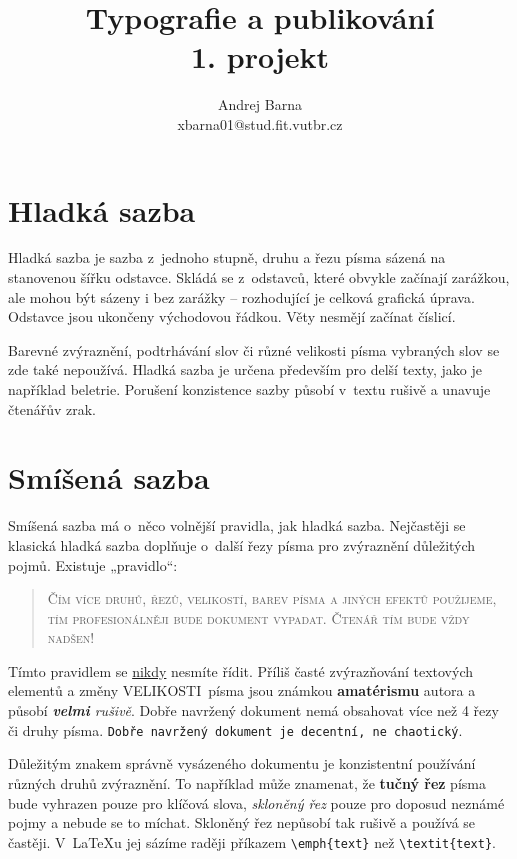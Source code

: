 \documentclass [11pt,a4paper,twocolumn]{article}
\title{Typografie a publikování\\ 
1. projekt}
\author{Andrej Barna\\
xbarna01@stud.fit.vutbr.cz}
\date{}
\providecommand{\uv}[1]{„#1“}
\begin{document}
\maketitle
\section{Hladká sazba}
Hladká sazba je sazba z~jednoho stupně, druhu a řezu písma sázená na stanovenou šířku odstavce. Skládá se z~odstavců, které obvykle začínají zarážkou, ale mohou být sázeny i bez zarážky -- rozhodující je celková grafická úprava. Odstavce jsou ukončeny východovou řádkou. Věty nesmějí začínat číslicí.

Barevné zvýraznění, podtrhávání slov či různé velikosti písma vybraných slov se zde také nepoužívá. Hladká sazba je určena především pro delší texty, jako je například beletrie. Porušení konzistence sazby působí v~textu rušivě a unavuje čtenářův zrak.

\section{Smíšená sazba}

Smíšená sazba má o~něco volnější pravidla, jak hladká sazba. Nejčastěji se klasická hladká sazba doplňuje o~další řezy písma pro zvýraznění důležitých pojmů. Existuje \uv{pravidlo}:

\begin{quotation}\textsc{Čím více druhů, řezů, velikostí, barev písma a jiných efektů použijeme, tím profesionálněji bude dokument vypadat. Čtenář tím bude vždy nadšen!}
\end{quotation}

Tímto pravidlem se \underline{nikdy} nesmíte řídit. Příliš časté zvýrazňování textových elementů a změny \huge V\LARGE E\Large L\large I\normalsize K\small O\footnotesize S\scriptsize T\tiny I~\normalsize písma \Large jsou \LARGE známkou \huge\textbf{amatérismu} \normalsize autora a působí \emph{\textbf{velmi} rušivě}. Dobře navržený dokument nemá obsahovat více než 4 řezy či druhy písma. \texttt{Dobře navržený dokument je decentní, ne chaotický}.

Důležitým znakem správně vysázeného dokumentu je konzistentní používání různých druhů zvýraznění. To například může znamenat, že \textbf{tučný řez} písma bude vyhrazen pouze pro klíčová slova, \emph{skloněný řez} pouze pro doposud neznámé pojmy a nebude se to míchat. Skloněný řez nepůsobí tak rušivě a používá se častěji. V~\LaTeX u jej sázíme raději příkazem \verb|\emph{text}| než \verb|\textit{text}|.
\end{document}
